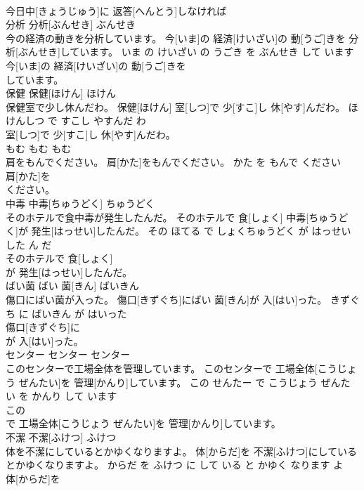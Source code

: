 \documentclass[8pt]{extreport}
\begin{document}
\begin{CJK}{UTF8}{min}
\\	今日中[きょうじゅう]に 返答[へんとう]しなければ
\\	分析	分析[ぶんせき]	ぶんせき	
\\	今の経済の動きを分析しています。	今[いま]の 経済[けいざい]の 動[うご]きを 分析[ぶんせき]しています。	いま の けいざい の うごき を ぶんせき して います	
\\	今[いま]の 経済[けいざい]の 動[うご]きを
\\	しています。			
\\	保健	保健[ほけん]	ほけん	
\\	保健室で少し休んだわ。	保健[ほけん] 室[しつ]で 少[すこ]し 休[やす]んだわ。	ほけんしつ で すこし やすんだ わ	
\\	室[しつ]で 少[すこ]し 休[やす]んだわ。			
\\	もむ	もむ	もむ	
\\	肩をもんでください。	肩[かた]をもんでください。	かた を もんで ください	
\\	肩[かた]を
\\	ください。			
\\	中毒	中毒[ちゅうどく]	ちゅうどく	
\\	そのホテルで食中毒が発生したんだ。	そのホテルで 食[しょく] 中毒[ちゅうどく]が 発生[はっせい]したんだ。	その ほてる で しょくちゅうどく が はっせい した ん だ	
\\	そのホテルで 食[しょく]
\\	が 発生[はっせい]したんだ。			
\\	ばい菌	ばい 菌[きん]	ばいきん	
\\	傷口にばい菌が入った。	傷口[きずぐち]にばい 菌[きん]が 入[はい]った。	きずぐち に ばいきん が はいった	
\\	傷口[きずぐち]に
\\	が 入[はい]った。			
\\	センター	センター	センター	
\\	このセンターで工場全体を管理しています。	このセンターで 工場全体[こうじょう ぜんたい]を 管理[かんり]しています。	この せんたー で こうじょう ぜんたい を かんり して います	
\\	この
\\	で 工場全体[こうじょう ぜんたい]を 管理[かんり]しています。			
\\	不潔	不潔[ふけつ]	ふけつ	
\\	体を不潔にしているとかゆくなりますよ。	体[からだ]を 不潔[ふけつ]にしているとかゆくなりますよ。	からだ を ふけつ に して いる と かゆく なります よ	
\\	体[からだ]を

\end{CJK}
\end{document}
